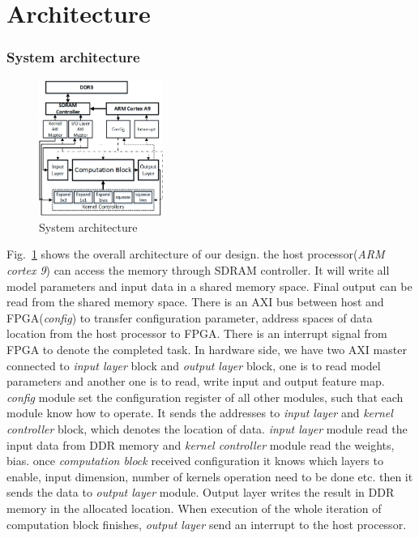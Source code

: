 \documentclass[conference]{IEEEtran}
\begin{document}
\section{Architecture}
\subsubsection{System architecture}

\begin{figure}[htbp]
\centerline{\includegraphics[width=0.36\textwidth]{archiecture.jpg}}
\caption{System architecture}
\label{arch}
\end{figure}

Fig.~\ref{arch} shows the overall architecture of our design. the host processor(\textit{ARM cortex 9}) can access the memory through SDRAM controller. It will write all model parameters and input data in a shared memory space. Final output can be read from the shared memory space. There is an AXI bus between host and FPGA(\textit{config}) to transfer configuration parameter, address spaces of data location from the host processor to FPGA. There is an interrupt signal from FPGA to denote the completed task. In hardware side, we have two AXI master connected to \textit{input layer} block and \textit{output layer} block, one is to read model parameters and another one is to read, write input and output feature map. \textit{config} module set the configuration register of all other modules, such that each module know how to operate. It sends the addresses to \textit{input layer} and \textit{kernel controller} block, which denotes the location of data. \textit{input layer} module read the input data from DDR memory and \textit{kernel controller} module read the weights, bias. once \textit{computation block} received configuration it knows which layers to enable, input dimension, number of kernels operation need to be done etc. then it sends the data to \textit{output layer} module. Output layer writes the result in DDR memory in the allocated location. When execution of the whole iteration of computation block finishes, \textit{output layer} send an interrupt to the host processor.
\end{document}
